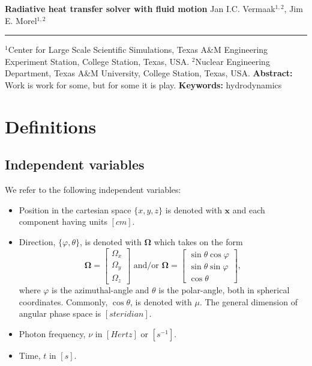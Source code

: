 \documentclass[10pt,letterpaper,notitlepage]{article}
\numberwithin{equation}{section}
\newcommand{\DOCTITLE}{Radiative heat transfer solver with fluid motion}
\newcommand{\Omegabf}{\mathbf{\Omega}}
\newcommand{\position}{\mathbf{x}}
\begin{document}
\noindent
{\LARGE\textbf{\DOCTITLE}}
\newline
\newline
\newline
\noindent
{\Large Jan I.C. Vermaak$^{1,2}$, Jim E. Morel$^{1,2}$}
\newline
\noindent\rule{\textwidth}{1pt}
{\small $^1$Center for Large Scale Scientific Simulations, Texas A\&M Engineering Experiment Station, College Station, Texas, USA.}
\newline\noindent
{\small $^2$Nuclear Engineering Department, Texas A\&M University, College Station, Texas, USA.}
\newline
\newline
\textbf{Abstract:}\newline\noindent
Work is work for some, but for some it is play.
\newline
\newline\noindent
{\small
\textbf{Keywords:} hydrodynamics}

\tableofcontents

\newpage
\section{Definitions}
\subsection{Independent variables}
We refer to the following independent variables:
\begin{itemize}
	\item Position in the cartesian space $\{x,y,z\}$ is denoted with $\position$ and each component having units $[cm]$.
	\item Direction, $\{\varphi, \theta\}$, is denoted with $\Omegabf$ which takes on the form 
	$$
	\Omegabf = 
	\begin{bmatrix}
		\Omega_x \\ \Omega_y \\ \Omega_z
	\end{bmatrix}
	\text{ and/or }
	\Omegabf = 
	\begin{bmatrix}
		\sin\theta \cos\varphi \\ \sin\theta \sin\varphi \\ \cos\theta
	\end{bmatrix},
	$$
	where $\varphi$ is the azimuthal-angle and $\theta$ is the polar-angle, both in spherical coordinates. Commonly, $\cos\theta$, is denoted with $\mu$. The general dimension of angular phase space is $[steridian]$.
	\item Photon frequency, $\nu$ in $[Hertz]$ or $[s^{-1}]$.
	\item Time, $t$ in $[s]$.
\end{itemize} 
\end{document}
